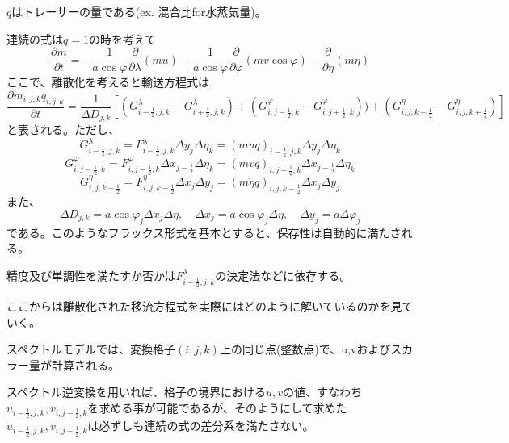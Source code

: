 \documentclass{jsbook}
\begin{document}
$q$はトレーサーの量である(ex. 混合比for水蒸気量)。

連続の式は$q=1$の時を考えて
\begin{equation}
  \frac{\partial m}{\partial t} = - \frac{1}{a \cos \varphi} \frac{\partial}{\partial \lambda}(mu)- \frac{1}{a \cos \varphi} \frac{\partial}{\partial \varphi}(mv \cos \varphi)- \frac{\partial}{\partial \eta} (m \dot{\eta})
\end{equation}
ここで、離散化を考えると輸送方程式は
\begin{equation}
\label{a1}
  \frac{\partial m_{i,j,k} q_{i,j,k}}{\partial t}=\frac{1}{\Delta D_{j,k}}[(G^{\lambda}_{i-\frac{1}{2},j,k}-G^{\lambda}_{i+\frac{1}{2},j,k})+(G^{\varphi}_{i,j-\frac{1}{2},k}-G^{\varphi}_{i,j+\frac{1}{2},k}))+(G^{\eta}_{i,j,k-\frac{1}{2}}-G^{\eta}_{i,j,k+\frac{1}{2}})]
\end{equation}
と表される。ただし、
\begin{equation}
  G^{\lambda}_{i-\frac{1}{2},j,k}=F^{\lambda}_{i-\frac{1}{2},j,k} \Delta y_{j} \Delta \eta_{k}=(muq)_{i-\frac{1}{2},j,k} \Delta y_{j} \Delta \eta_{k}
\end{equation}
\begin{equation}
  G^{\varphi}_{i,j-\frac{1}{2},k}=F^{\varphi}_{i,j-\frac{1}{2},k} \Delta x_{j-\frac{1}{2}} \Delta \eta_{k}=(mvq)_{i,j-\frac{1}{2},k} \Delta x_{j-\frac{1}{2}} \Delta \eta_{k}
\end{equation}
\begin{equation}
  G^{\eta}_{i,j,k-\frac{1}{2}}=F^{\eta}_{i,j,k-\frac{1}{2}} \Delta x_{j} \Delta y_{j}=(m \dot{\eta} q)_{i,j,k-\frac{1}{2}} \Delta x_{j} \Delta y_{j}
\end{equation}
また、
\begin{equation}
  \Delta D_{j,k}=a \cos \varphi_{j} \Delta x_{j} \Delta \eta,\quad \Delta x_{j}=a \cos \varphi_{j} \Delta \eta,\quad \Delta y_{j}=a \Delta \varphi_{j}
\end{equation}
である。このようなフラックス形式を基本とすると、保存性は自動的に満たされる。

精度及び単調性を満たすか否かは$F^{\lambda}_{i-\frac{1}{2},j,k}$の決定法などに依存する。

ここからは離散化された移流方程式を実際にはどのように解いているのかを見ていく。

スペクトルモデルでは、変換格子$(i,j,k)$上の同じ点(整数点)で、u,vおよびスカラー量が計算される。

スペクトル逆変換を用いれば、格子の境界における$u,v$の値、すなわち$u_{i-\frac{1}{2},j,k},v_{i,j-\frac{1}{2},k}$を求める事が可能であるが、そのようにして求めた$u_{i-\frac{1}{2},j,k},v_{i,j-\frac{1}{2},k}$は必ずしも連続の式の差分系を満たさない。
\end{document}
